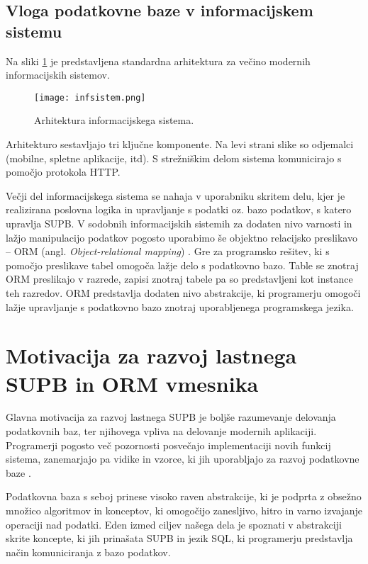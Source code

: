 \documentclass[a4paper,12pt,openright]{book}
\begin{document}
    \subsection{Vloga podatkovne baze v informacijskem sistemu}

    Na sliki \ref{infsistem} je predstavljena standardna arhitektura za večino modernih informacijskih sistemov.

    \begin{figure}[h]
        \centerline{\texttt{[image: infsistem.png]}}
        \caption{Arhitektura informacijskega sistema.}
        \label{infsistem}
    \end{figure}

    \noindent
    Arhitekturo sestavljajo tri ključne komponente. Na levi strani slike so odjemalci (mobilne, spletne aplikacije, itd). S strežniškim delom sistema komunicirajo s pomočjo protokola HTTP.

    Večji del informacijskega sistema se nahaja v uporabniku skritem delu, kjer je realizirana poslovna logika in upravljanje s podatki oz. bazo podatkov, s katero upravlja SUPB. V sodobnih informacijskih sistemih za dodaten nivo varnosti in lažjo manipulacijo podatkov pogosto uporabimo še objektno relacijsko preslikavo – ORM (angl. \textit{Object-relational mapping}) \cite{torres-17}. Gre za programsko rešitev, ki s pomočjo preslikave tabel omogoča lažje delo s podatkovno bazo. Table se znotraj ORM preslikajo v razrede, zapisi znotraj tabele pa so predstavljeni kot instance teh razredov. ORM predstavlja dodaten nivo abstrakcije, ki programerju omogoči lažje upravljanje s podatkovno bazo znotraj uporabljenega programskega jezika.

    \section{Motivacija za razvoj lastnega SUPB in ORM vmesnika}
    Glavna motivacija za razvoj lastnega SUPB je boljše razumevanje delovanja podatkovnih baz, ter njihovega vpliva na delovanje modernih aplikaciji. Programerji pogosto več pozornosti posvečajo implementaciji novih funkcij sistema, zanemarjajo pa vidike in vzorce, ki jih uporabljajo za razvoj podatkovne baze \cite{karwin2010sql}.
    
    Podatkovna baza s seboj prinese visoko raven abstrakcije, ki je podprta z obsežno množico algoritmov in konceptov, ki omogočijo zanesljivo, hitro in varno izvajanje operaciji nad podatki. Eden izmed ciljev našega dela je spoznati v abstrakciji skrite koncepte, ki jih prinašata SUPB in jezik SQL, ki programerju predstavlja način komuniciranja z bazo podatkov.
\end{document}
